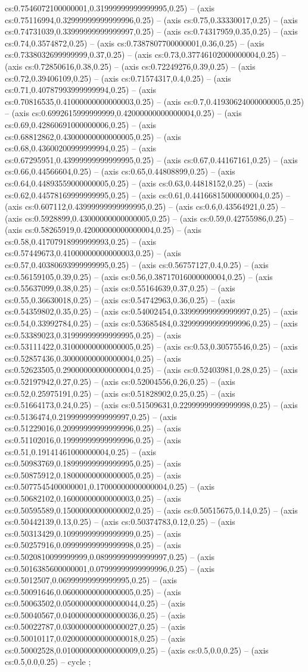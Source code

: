 cs:0.7546072100000001,0.31999999999999995,0.25) -- (axis cs:0.75116994,0.32999999999999996,0.25) -- (axis cs:0.75,0.33330017,0.25) -- (axis cs:0.74731039,0.33999999999999997,0.25) -- (axis cs:0.74317959,0.35,0.25) -- (axis cs:0.74,0.3574872,0.25) -- (axis cs:0.7387807700000001,0.36,0.25) -- (axis cs:0.7338032699999999,0.37,0.25) -- (axis cs:0.73,0.37746102000000004,0.25) -- (axis cs:0.72850616,0.38,0.25) -- (axis cs:0.72249276,0.39,0.25) -- (axis cs:0.72,0.39406109,0.25) -- (axis cs:0.71574317,0.4,0.25) -- (axis cs:0.71,0.40787993999999994,0.25) -- (axis cs:0.70816535,0.41000000000000003,0.25) -- (axis cs:0.7,0.41930624000000005,0.25) -- (axis cs:0.6992615999999999,0.42000000000000004,0.25) -- (axis cs:0.69,0.42860691000000006,0.25) -- (axis cs:0.68812862,0.43000000000000005,0.25) -- (axis cs:0.68,0.43600200999999994,0.25) -- (axis cs:0.67295951,0.43999999999999995,0.25) -- (axis cs:0.67,0.44167161,0.25) -- (axis cs:0.66,0.44566604,0.25) -- (axis cs:0.65,0.44808899,0.25) -- (axis cs:0.64,0.44893559000000005,0.25) -- (axis cs:0.63,0.44818152,0.25) -- (axis cs:0.62,0.44578169999999995,0.25) -- (axis cs:0.61,0.44166815000000004,0.25) -- (axis cs:0.607112,0.43999999999999995,0.25) -- (axis cs:0.6,0.43564921,0.25) -- (axis cs:0.5928899,0.43000000000000005,0.25) -- (axis cs:0.59,0.42755986,0.25) -- (axis cs:0.58265919,0.42000000000000004,0.25) -- (axis cs:0.58,0.41707918999999993,0.25) -- (axis cs:0.57449673,0.41000000000000003,0.25) -- (axis cs:0.57,0.40380693999999995,0.25) -- (axis cs:0.56757127,0.4,0.25) -- (axis cs:0.56159105,0.39,0.25) -- (axis cs:0.56,0.38717016000000004,0.25) -- (axis cs:0.55637099,0.38,0.25) -- (axis cs:0.55164639,0.37,0.25) -- (axis cs:0.55,0.36630018,0.25) -- (axis cs:0.54742963,0.36,0.25) -- (axis cs:0.54359802,0.35,0.25) -- (axis cs:0.54002454,0.33999999999999997,0.25) -- (axis cs:0.54,0.33992784,0.25) -- (axis cs:0.53685484,0.32999999999999996,0.25) -- (axis cs:0.53389023,0.31999999999999995,0.25) -- (axis cs:0.53111422,0.31000000000000005,0.25) -- (axis cs:0.53,0.30575546,0.25) -- (axis cs:0.52857436,0.30000000000000004,0.25) -- (axis cs:0.52623505,0.29000000000000004,0.25) -- (axis cs:0.52403981,0.28,0.25) -- (axis cs:0.52197942,0.27,0.25) -- (axis cs:0.52004556,0.26,0.25) -- (axis cs:0.52,0.25975191,0.25) -- (axis cs:0.51828902,0.25,0.25) -- (axis cs:0.51664173,0.24,0.25) -- (axis cs:0.51509631,0.22999999999999998,0.25) -- (axis cs:0.5136474,0.21999999999999997,0.25) -- (axis cs:0.51229016,0.20999999999999996,0.25) -- (axis cs:0.51102016,0.19999999999999996,0.25) -- (axis cs:0.51,0.19141461000000004,0.25) -- (axis cs:0.50983769,0.18999999999999995,0.25) -- (axis cs:0.50875912,0.18000000000000005,0.25) -- (axis cs:0.5077545400000001,0.17000000000000004,0.25) -- (axis cs:0.50682102,0.16000000000000003,0.25) -- (axis cs:0.50595589,0.15000000000000002,0.25) -- (axis cs:0.50515675,0.14,0.25) -- (axis cs:0.50442139,0.13,0.25) -- (axis cs:0.50374783,0.12,0.25) -- (axis cs:0.50313429,0.10999999999999999,0.25) -- (axis cs:0.50257916,0.09999999999999998,0.25) -- (axis cs:0.5020810099999999,0.08999999999999997,0.25) -- (axis cs:0.5016385600000001,0.07999999999999996,0.25) -- (axis cs:0.5012507,0.06999999999999995,0.25) -- (axis cs:0.50091646,0.06000000000000005,0.25) -- (axis cs:0.50063502,0.050000000000000044,0.25) -- (axis cs:0.50040567,0.040000000000000036,0.25) -- (axis cs:0.50022787,0.030000000000000027,0.25) -- (axis cs:0.50010117,0.020000000000000018,0.25) -- (axis cs:0.50002528,0.010000000000000009,0.25) -- (axis cs:0.5,0.0,0.25) -- (axis cs:0.5,0.0,0.25) -- cycle
;

